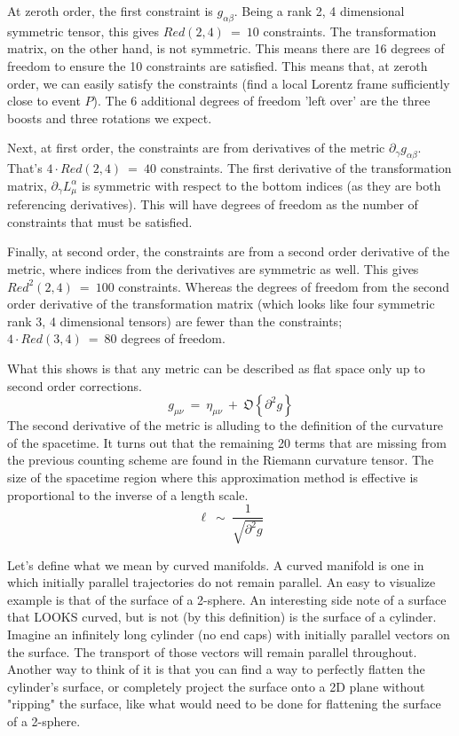 \hskip 25pt At zeroth order, the first constraint is $g_{\alpha\beta}$.  Being a rank 2, 4 dimensional symmetric tensor,
this gives $\mathbf{\mathit{Red}}(2,4)\ =\ 10$
constraints.  The transformation matrix, on the other hand, is not symmetric.  This means there are 16 degrees of freedom
to ensure the 10 constraints are satisfied.  This means that, at zeroth order, we can easily satisfy the constraints
(find a local Lorentz frame sufficiently close to event $P$).  The 6 additional degrees of freedom 'left over' are the
three boosts and three rotations we expect.

\hskip 25pt Next, at first order, the constraints are from derivatives of the metric
$\partial_{\gamma}g_{\alpha\beta}$.  That's $4\cdot\mathbf{\mathit{Red}}(2,4)\ =\ 40$ constraints.  The
first derivative of the transformation matrix, $\partial_{\gamma}L^{\alpha}_{\mu}$ is symmetric with respect to the
bottom indices (as they are both referencing derivatives).  This will have degrees of freedom as the number of
constraints that must be satisfied.

\hskip 25pt Finally, at second order, the constraints are from a second order derivative of the metric, where indices from
the derivatives are symmetric as well.  This gives $\mathbf{\mathit{Red}}^2(2,4)\ =\ 100$ constraints.  Whereas the
degrees of freedom from the second order derivative of the transformation matrix (which looks like four symmetric
rank 3, 4 dimensional tensors) are fewer than the constraints; $4\cdot\mathbf{\mathit{Red}}(3,4)\ =\ 80$ degrees of freedom.

\hskip 25pt What this shows is that any metric can be described as flat space only up to second order corrections.
\begin{equation}
  g_{\mu\nu}\ =\ \eta_{\mu\nu}\ +\ \mathfrak{O}\left\{\partial^2g\right\}
\end{equation}
The second derivative of the metric is alluding to the definition of the curvature of the spacetime.  It turns out that the
remaining 20 terms that are missing from the previous counting scheme are found in the Riemann curvature tensor.  The
size of the spacetime region where this approximation method is effective is proportional to the inverse of a length scale.
\begin{equation}
  \ell\ \sim\ \frac{1}{\sqrt{\partial^2g}}
\end{equation}

\hskip 25pt Let's define what we mean by curved manifolds.  A curved manifold is one in which initially parallel
trajectories do not remain parallel.  An easy to visualize example is that of the surface of a 2-sphere.  An interesting
side note of a surface that LOOKS curved, but is not (by this definition) is the surface of a cylinder.  Imagine an
infinitely long cylinder (no end caps) with initially parallel vectors on the surface.  The transport of those vectors will
remain parallel throughout.  Another way to think of it is that you can find a way to perfectly flatten the cylinder's
surface, or completely project the surface onto a 2D plane without "ripping" the surface, like what would need to be done
for flattening the surface of a 2-sphere.

